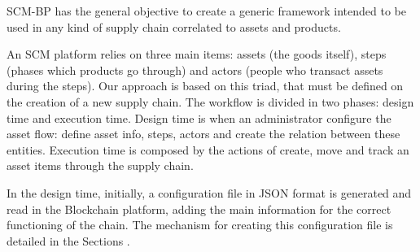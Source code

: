 \label{chap:Technical}

\acresetall 

\ac{SCM-BP} has the general objective to create a generic framework intended to be used in any kind of supply chain correlated to assets and products. 

An SCM platform relies on three main items: assets (the goods itself), steps (phases which products go through) and actors (people who transact assets during the steps). Our approach is based on this triad, that must be defined on the creation of a new supply chain. The workflow is divided in two phases: design time and execution time. Design time is when an administrator configure the asset flow: define asset info, steps, actors and create the relation between these entities. Execution time is composed by the actions of create, move and track an asset items through the supply chain. 

In the design time, initially, a configuration file in JSON format is generated and read in the Blockchain platform, adding the main information for the correct functioning of the chain. The mechanism for creating this configuration file is detailed in the Sections .




%

%
%
